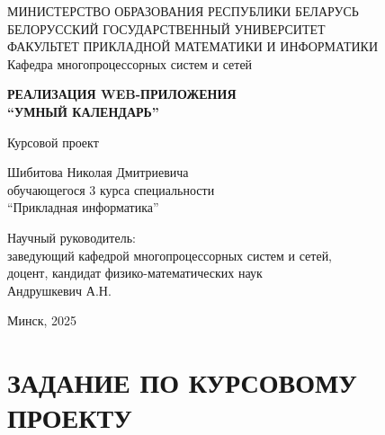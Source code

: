 \documentclass[14pt,a4paper]{extreport}
\begin{document}
\begin{titlepage}
\thispagestyle{empty}
\begin{center}
МИНИСТЕРСТВО ОБРАЗОВАНИЯ РЕСПУБЛИКИ БЕЛАРУСЬ\\
БЕЛОРУССКИЙ ГОСУДАРСТВЕННЫЙ УНИВЕРСИТЕТ\\
ФАКУЛЬТЕТ ПРИКЛАДНОЙ МАТЕМАТИКИ И ИНФОРМАТИКИ\\
Кафедра многопроцессорных систем и сетей
\end{center}

\vspace{42mm}

\begin{center}
\textbf{РЕАЛИЗАЦИЯ WEB-ПРИЛОЖЕНИЯ}\\
\textbf{``УМНЫЙ КАЛЕНДАРЬ''}
\end{center}

\vspace{16mm}

\begin{center}
Курсовой проект
\end{center}

\vspace{32mm}

\begin{flushright}
\begin{minipage}{0.48\textwidth}
Шибитова Николая Дмитриевича\\
обучающегося 3 курса специальности\\
``Прикладная информатика''

\vspace{8mm}

Научный руководитель:\\
заведующий кафедрой многопроцессорных систем и сетей,\\
доцент, кандидат физико-математических наук\\
Андрушкевич А.Н.
\end{minipage}
\end{flushright}

\vfill

\begin{center}
Минск, 2025
\end{center}
\end{titlepage}

\chapter*{ЗАДАНИЕ ПО КУРСОВОМУ ПРОЕКТУ}
\thispagestyle{empty}
\end{document}
